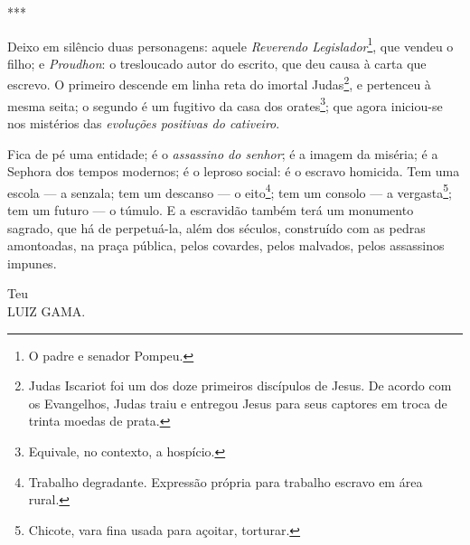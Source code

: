 ***

Deixo em silêncio duas personagens: aquele \emph{Reverendo
Legislador}\footnote{O padre e senador Pompeu.}, que vendeu o filho; e
\emph{Proudhon}: o tresloucado autor do escrito, que deu causa à carta
que escrevo. O primeiro descende em linha reta do imortal
Judas\footnote{Judas Iscariot foi um dos doze primeiros discípulos de
  Jesus. De acordo com os Evangelhos, Judas traiu e entregou Jesus para
  seus captores em troca de trinta moedas de prata.}, e pertenceu à
mesma seita; o segundo é um fugitivo da casa dos orates\footnote{
  Equivale, no contexto, a hospício.}; que agora iniciou-se nos
mistérios das \emph{evoluções positivas do cativeiro}.

Fica de pé uma entidade; é o \emph{assassino do senhor}; é a imagem da
miséria; é a Sephora dos tempos modernos; é o leproso social: é o
escravo homicida. Tem uma escola --- a senzala; tem um descanso --- o
eito\footnote{Trabalho degradante. Expressão própria para trabalho
  escravo em área rural.}; tem um consolo --- a vergasta\footnote{
  Chicote, vara fina usada para açoitar, torturar.};
tem um futuro --- o
túmulo. E a escravidão também terá um monumento sagrado, que há de
perpetuá-la, além dos séculos, construído com as pedras amontoadas, na
praça pública, pelos covardes, pelos malvados, pelos assassinos impunes.

Teu\\
LUIZ GAMA.

\pagebreak
\mbox{}\vfill
\thispagestyle{empty}

